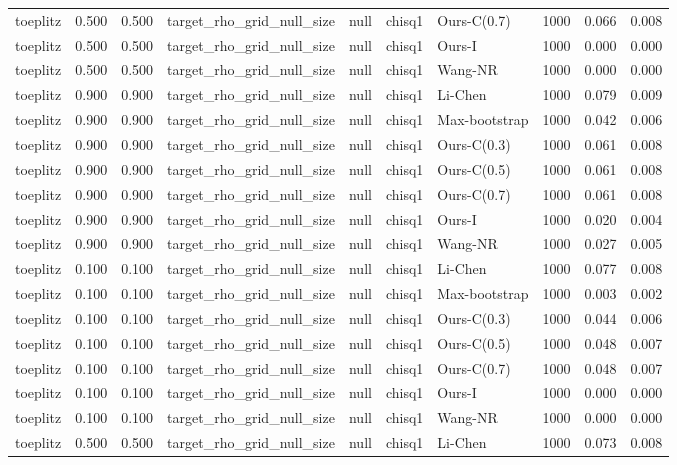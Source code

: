 \begin{tabular}{lrrllllrrr}
toeplitz & 0.500 & 0.500 & target\_rho\_grid\_null\_size & null & chisq1 & Ours-C(0.7) & 1000 & 0.066 & 0.008 \\
toeplitz & 0.500 & 0.500 & target\_rho\_grid\_null\_size & null & chisq1 & Ours-I & 1000 & 0.000 & 0.000 \\
toeplitz & 0.500 & 0.500 & target\_rho\_grid\_null\_size & null & chisq1 & Wang-NR & 1000 & 0.000 & 0.000 \\
toeplitz & 0.900 & 0.900 & target\_rho\_grid\_null\_size & null & chisq1 & Li-Chen & 1000 & 0.079 & 0.009 \\
toeplitz & 0.900 & 0.900 & target\_rho\_grid\_null\_size & null & chisq1 & Max-bootstrap & 1000 & 0.042 & 0.006 \\
toeplitz & 0.900 & 0.900 & target\_rho\_grid\_null\_size & null & chisq1 & Ours-C(0.3) & 1000 & 0.061 & 0.008 \\
toeplitz & 0.900 & 0.900 & target\_rho\_grid\_null\_size & null & chisq1 & Ours-C(0.5) & 1000 & 0.061 & 0.008 \\
toeplitz & 0.900 & 0.900 & target\_rho\_grid\_null\_size & null & chisq1 & Ours-C(0.7) & 1000 & 0.061 & 0.008 \\
toeplitz & 0.900 & 0.900 & target\_rho\_grid\_null\_size & null & chisq1 & Ours-I & 1000 & 0.020 & 0.004 \\
toeplitz & 0.900 & 0.900 & target\_rho\_grid\_null\_size & null & chisq1 & Wang-NR & 1000 & 0.027 & 0.005 \\
toeplitz & 0.100 & 0.100 & target\_rho\_grid\_null\_size & null & chisq1 & Li-Chen & 1000 & 0.077 & 0.008 \\
toeplitz & 0.100 & 0.100 & target\_rho\_grid\_null\_size & null & chisq1 & Max-bootstrap & 1000 & 0.003 & 0.002 \\
toeplitz & 0.100 & 0.100 & target\_rho\_grid\_null\_size & null & chisq1 & Ours-C(0.3) & 1000 & 0.044 & 0.006 \\
toeplitz & 0.100 & 0.100 & target\_rho\_grid\_null\_size & null & chisq1 & Ours-C(0.5) & 1000 & 0.048 & 0.007 \\
toeplitz & 0.100 & 0.100 & target\_rho\_grid\_null\_size & null & chisq1 & Ours-C(0.7) & 1000 & 0.048 & 0.007 \\
toeplitz & 0.100 & 0.100 & target\_rho\_grid\_null\_size & null & chisq1 & Ours-I & 1000 & 0.000 & 0.000 \\
toeplitz & 0.100 & 0.100 & target\_rho\_grid\_null\_size & null & chisq1 & Wang-NR & 1000 & 0.000 & 0.000 \\
toeplitz & 0.500 & 0.500 & target\_rho\_grid\_null\_size & null & chisq1 & Li-Chen & 1000 & 0.073 & 0.008 \\

\end{tabular}

